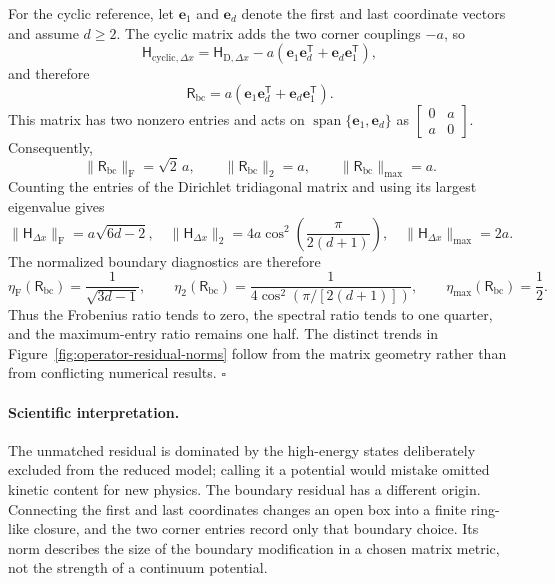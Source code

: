 \documentclass[11pt]{article}
\newcommand{\fro}{\mathrm{F}}
\newcommand{\mat}[1]{\mathsf{#1}}
\newcommand{\vect}[1]{\boldsymbol{#1}}
\begin{document}
For the cyclic reference, let $\vect{e}_1$ and $\vect{e}_d$ denote the first and last
coordinate vectors and assume $d\geq2$. The cyclic matrix adds the two corner
couplings $-a$, so
\begin{equation}
 \mat{H}_{\mathrm{cyclic},\Delta x}
 =\mat{H}_{\mathrm{D},\Delta x}
 -a(\vect{e}_1\vect{e}_d^{\mathsf T}
    +\vect{e}_d\vect{e}_1^{\mathsf T}),
\end{equation}
and therefore
\begin{equation}
 \mat{R}_{\mathrm{bc}}
 =a(\vect{e}_1\vect{e}_d^{\mathsf T}
    +\vect{e}_d\vect{e}_1^{\mathsf T}).
 \label{eq:appendix-boundary-residual}
\end{equation}
This matrix has two nonzero entries and acts on
$\operatorname{span}\{\vect{e}_1,\vect{e}_d\}$ as
$\left[\begin{smallmatrix}0&a\\a&0\end{smallmatrix}\right]$. Consequently,
\begin{equation}
 \lVert\mat{R}_{\mathrm{bc}}\rVert_{\fro}=\sqrt{2}\,a,
 \qquad
 \lVert\mat{R}_{\mathrm{bc}}\rVert_2=a,
 \qquad
 \lVert\mat{R}_{\mathrm{bc}}\rVert_{\max}=a.
 \label{eq:appendix-boundary-raw-norms}
\end{equation}
Counting the entries of the Dirichlet tridiagonal matrix and using its largest
eigenvalue gives
\begin{equation}
 \lVert\mat{H}_{\Delta x}\rVert_{\fro}=a\sqrt{6d-2},
 \quad
 \lVert\mat{H}_{\Delta x}\rVert_2
 =4a\cos^2\!\left(\frac{\pi}{2(d+1)}\right),
 \quad
 \lVert\mat{H}_{\Delta x}\rVert_{\max}=2a.
\end{equation}
The normalized boundary diagnostics are therefore
\begin{equation}
 \eta_{\fro}(\mat{R}_{\mathrm{bc}})=\frac{1}{\sqrt{3d-1}},
 \qquad
 \eta_2(\mat{R}_{\mathrm{bc}})
 =\frac{1}{4\cos^2(\pi/[2(d+1)])},
 \qquad
 \eta_{\max}(\mat{R}_{\mathrm{bc}})=\frac12.
 \label{eq:appendix-boundary-normalized-norms}
\end{equation}
Thus the Frobenius ratio tends to zero, the spectral ratio tends to one quarter, and
the maximum-entry ratio remains one half. The distinct trends in
Figure~\ref{fig:operator-residual-norms} follow from the matrix geometry rather than
from conflicting numerical results.
\hfill$\square$

\paragraph{Scientific interpretation.}
The unmatched residual is dominated by the high-energy states deliberately excluded
from the reduced model; calling it a potential would mistake omitted kinetic content
for new physics. The boundary residual has a different origin. Connecting the first
and last coordinates changes an open box into a finite ring-like closure, and the two
corner entries record only that boundary choice. Its norm describes the size of the
boundary modification in a chosen matrix metric, not the strength of a continuum
potential.
\end{document}
